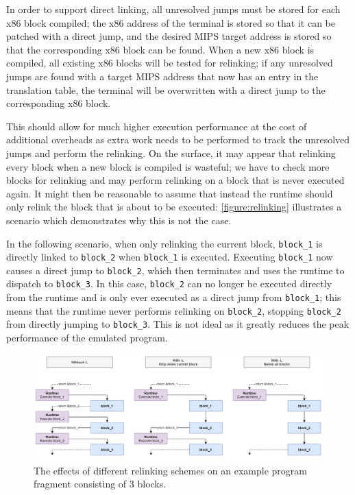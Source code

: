In order to support direct linking, all unresolved jumps must be stored for each x86 block compiled; the x86 address of the terminal is stored so that it can be patched with a direct jump, and the desired MIPS target address is stored so that the corresponding x86 block can be found. When a new x86 block is compiled, all existing x86 blocks will be tested for relinking; if any unresolved jumps are found with a target MIPS address that now has an entry in the translation table, the terminal will be overwritten with a direct jump to the corresponding x86 block.

This should allow for much higher execution performance at the cost of additional overheads as extra work needs to be performed to track the unresolved jumps and perform the relinking. On the surface, it may appear that relinking every block when a new block is compiled is wasteful; we have to check more blocks for relinking and may perform relinking on a block that is never executed again. It might then be reasonable to assume that instead the runtime should only relink the block that is about to be executed: \autoref{figure:relinking} illustrates a scenario which demonstrates why this is not the case.

In the following scenario, when only relinking the current block, \texttt{block\_1} is directly linked to \texttt{block\_2} when \texttt{block\_1} is executed. Executing \texttt{block\_1} now causes a direct jump to \texttt{block\_2}, which then terminates and uses the runtime to dispatch to \texttt{block\_3}. In this case, \texttt{block\_2} can no longer be executed directly from the runtime and is only ever executed as a direct jump from \texttt{block\_1}; this means that the runtime never performs relinking on \texttt{block\_2}, stopping \texttt{block\_2} from directly jumping to \texttt{block\_3}. This is not ideal as it greatly reduces the peak performance of the emulated program.

\begin{figure}[h]
    \centering
    \includegraphics[width=1\linewidth]{diagrams/relinking.png}
    \caption{The effects of different relinking schemes on an example program fragment consisting of 3 blocks.}
    \label{figure:relinking}
\end{figure}

